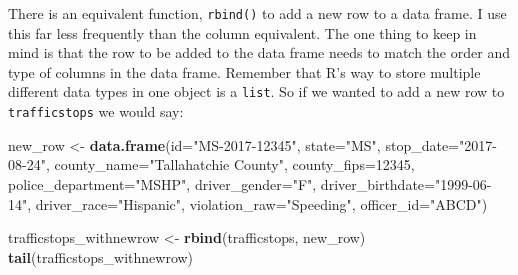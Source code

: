 \documentclass[]{book}
\newenvironment{Shaded}{\begin{snugshade}}{\end{snugshade}}
\newcommand{\KeywordTok}[1]{\textcolor[rgb]{0.13,0.29,0.53}{\textbf{#1}}}
\newcommand{\DataTypeTok}[1]{\textcolor[rgb]{0.13,0.29,0.53}{#1}}
\newcommand{\DecValTok}[1]{\textcolor[rgb]{0.00,0.00,0.81}{#1}}
\newcommand{\StringTok}[1]{\textcolor[rgb]{0.31,0.60,0.02}{#1}}
\newcommand{\NormalTok}[1]{#1}
\begin{document}
There is an equivalent function, \texttt{rbind()} to add a new row to a
data frame. I use this far less frequently than the column equivalent.
The one thing to keep in mind is that the row to be added to the data
frame needs to match the order and type of columns in the data frame.
Remember that R's way to store multiple different data types in one
object is a \texttt{list}. So if we wanted to add a new row to
\texttt{trafficstops} we would say:

\begin{Shaded}
\begin{Highlighting}[]
\NormalTok{new_row <-}\StringTok{ }\KeywordTok{data.frame}\NormalTok{(}\DataTypeTok{id=}\StringTok{"MS-2017-12345"}\NormalTok{, }\DataTypeTok{state=}\StringTok{"MS"}\NormalTok{, }\DataTypeTok{stop_date=}\StringTok{"2017-08-24"}\NormalTok{,}
                \DataTypeTok{county_name=}\StringTok{"Tallahatchie County"}\NormalTok{, }\DataTypeTok{county_fips=}\DecValTok{12345}\NormalTok{,}
                \DataTypeTok{police_department=}\StringTok{"MSHP"}\NormalTok{, }\DataTypeTok{driver_gender=}\StringTok{"F"}\NormalTok{, }\DataTypeTok{driver_birthdate=}\StringTok{"1999-06-14"}\NormalTok{,}
                \DataTypeTok{driver_race=}\StringTok{"Hispanic"}\NormalTok{, }\DataTypeTok{violation_raw=}\StringTok{"Speeding"}\NormalTok{, }\DataTypeTok{officer_id=}\StringTok{"ABCD"}\NormalTok{)}

\NormalTok{trafficstops_withnewrow <-}\StringTok{ }\KeywordTok{rbind}\NormalTok{(trafficstops, new_row)}
\KeywordTok{tail}\NormalTok{(trafficstops_withnewrow)}
\end{Highlighting}
\end{Shaded}
\end{document}
